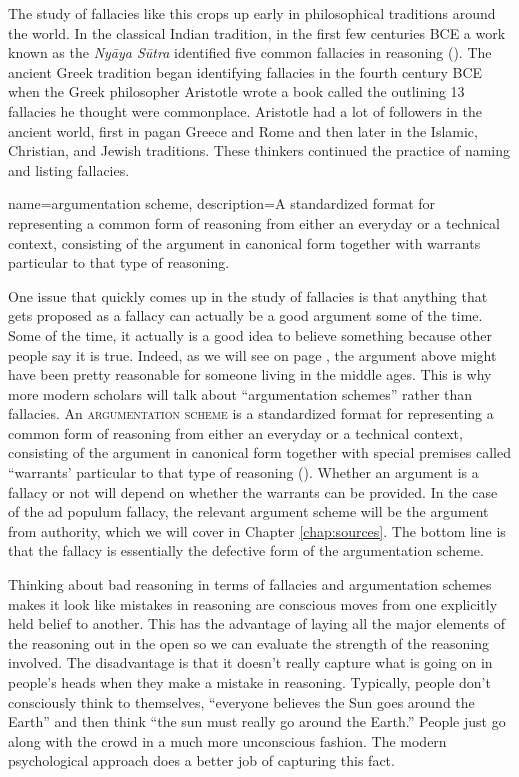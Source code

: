The study of fallacies like this crops up early in philosophical traditions around the world. In the classical Indian tradition, in the first few centuries \textsc{BCE} a work known as the \textit{Ny\={a}ya S\={u}tra} identified five common fallacies in reasoning (\cite{Gautama1982}). The ancient Greek tradition began identifying fallacies in the fourth century \textsc{BCE} when the Greek philosopher Aristotle wrote a book called the \cite*{Aristotle:refutations} outlining 13 fallacies he thought were commonplace. Aristotle had a lot of followers in the ancient world, first in pagan Greece and Rome and then later in the Islamic, Christian, and Jewish traditions. These thinkers continued the practice of naming and listing fallacies. 

{
name=argumentation scheme,
description={A standardized format for representing a common form of reasoning from either an everyday or a technical context, consisting of the argument in canonical form together with warrants particular to that type of reasoning.}
}

One issue that quickly comes up in the study of fallacies is that anything that gets proposed as a fallacy can actually be a good argument some of the time. Some of the time, it actually is a good idea to believe something because other people say it is true. Indeed, as we will see on page \pageref{def:ad_populum}, the argument above might have been pretty reasonable for someone living in the middle ages. This is why more modern scholars will talk about ``argumentation schemes'' rather than fallacies. An \textsc{\gls{argumentation scheme}}\label{def:argumentation_scheme} is a standardized format for representing a common form of reasoning from either an everyday or a technical context, consisting of the argument in canonical form together with special premises called ``warrants' particular to that type of reasoning (\cite{Walton2008b}). Whether an argument is a fallacy or not will depend on whether the warrants can be provided. In the case of the ad populum fallacy, the relevant argument scheme will be the argument from authority, which we will cover in Chapter \ref{chap:sources}. The bottom line is that the fallacy is essentially the defective form of the argumentation scheme. 

Thinking about bad reasoning in terms of fallacies and argumentation schemes makes it look like mistakes in reasoning are conscious moves from one explicitly held belief to another. This has the advantage of laying all the major elements of the reasoning out in the open so we can evaluate the strength of the reasoning involved. The disadvantage is that it doesn't really capture what is going on in people's heads when they make a mistake in reasoning. Typically, people don't consciously think to themselves, ``everyone believes the Sun goes around the Earth'' and then think ``the sun must really go around the Earth.'' People just go along with the crowd in a much more unconscious fashion. The modern psychological approach does a better job of capturing this fact.

